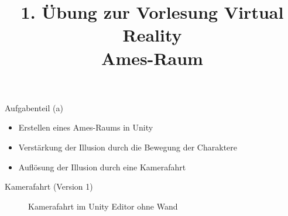 \documentclass{beamer}
\author[Jan Niclas Ruppenthal, Michael Feldmann, Philipp Geier]{}
\title[]{1. Übung zur Vorlesung
Virtual Reality\\ Ames-Raum}
\institute[Universität Trier]{}
\date[06. Mai 2024]{}
\begin{document}
{
  \begin{frame}
    \maketitle
  \end{frame}
}
    
	


\begin{frame}{Aufgabenteil (a)}
\begin{itemize}
\item Erstellen eines Ames-Raums in Unity
\item Verstärkung der Illusion durch die Bewegung der Charaktere
\item Auflösung der Illusion durch eine Kamerafahrt
\end{itemize}
\end{frame}

\begin{frame}{Kamerafahrt (Version 1)}
\begin{figure}
    \centering
\caption{Kamerafahrt im Unity Editor ohne Wand}
\end{figure}
\end{frame}
\end{document}
